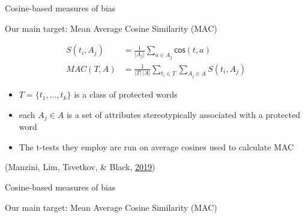\documentclass[10pt,ignorenonframetext,x11names, dvipsnames, bibspacing,natbib]{beamer}
\providecommand{\tightlist}{%
  \setlength{\itemsep}{0pt}\setlength{\parskip}{0pt}}
\begin{document}
\begin{frame}{Cosine-based measures of bias}

\begin{block}{Our main target: Mean Average Cosine Similarity (MAC)}

\begin{align*}
S(t_i, A_j) & = \frac{1}{\vert A_j\vert}\sum_{a\in A_j}\mathsf{cos}(t,a) \\
MAC(T,A) & = \frac{1}{\vert T \vert \,\vert A\vert}\sum_{t_i \in T }\sum_{A_j \in A} S(t_i,A_j)
\end{align*}

\begin{itemize}
\item
  \(T = \{t_1, \dots, t_k\}\) is a class of protected words
\item
  each \(A_j\in A\) is a set of attributes stereotypically associated
  with a protected word
\end{itemize}

\begin{itemize}
\tightlist
\item
  The t-tests they employ are run on average cosines used to calculate
  MAC
\end{itemize}

\footnotesize 

(Manzini, Lim, Tsvetkov, \& Black,
\protect\hyperlink{ref-Manzini2019blackToCriminal}{2019})

\end{block}

\end{frame}

\begin{frame}{Cosine-based measures of bias}

\begin{block}{Our main target: Mean Average Cosine Similarity (MAC)}

\footnotesize 

\begin{table}

\caption{\label{tab:religionTableHeadEarly}Rows the religion dataset.}
\centering
{}
\end{table}

\normalsize

\end{block}

\end{frame}
\end{document}
